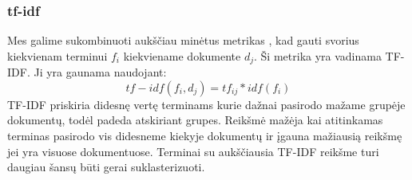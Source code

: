 \documentclass{VUMIFInfKursinis}
\begin{document}
\subsubsection{tf-idf}
Mes galime sukombinuoti aukščiau minėtus metrikas , kad gauti svorius kiekvienam terminui $f_i$ kiekviename dokumente $d_j$. Ši metrika yra vadinama TF-IDF\@. Ji yra gaunama naudojant:
\begin{equation}
	tf-idf(f_i,d_j) = tf_{ij} * idf (f_i)
\end{equation}
TF-IDF priskiria didesnę vertę terminams kurie dažnai pasirodo mažame grupėje dokumentų, todėl padeda atskiriant grupes. Reikšmė mažėja kai atitinkamas terminas pasirodo vis didesneme kiekyje dokumentų ir įgauna mažiausią reikšmę jei yra visuose dokumentuose. Terminai su aukščiausia TF-IDF reikšme turi daugiau šansų būti gerai suklasterizuoti. 
\end{document}
